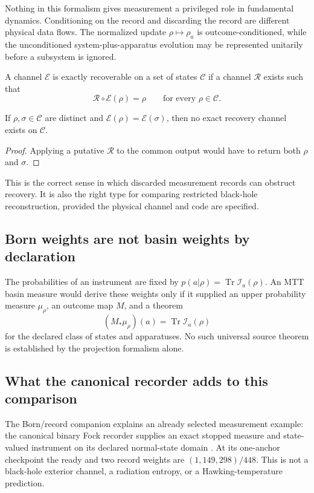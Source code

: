\documentclass[11pt]{article}
\newcommand{\C}{\mathcal C}
\newcommand{\E}{\mathcal E}
\newcommand{\R}{\mathcal R}
\begin{document}
Nothing in this formalism gives measurement a privileged role in fundamental
dynamics. Conditioning on the record and discarding the record are different
physical data flows. The normalized update $\rho\mapsto\rho_a$ is
outcome-conditioned, while the unconditioned system-plus-apparatus evolution
may be represented unitarily before a subsystem is ignored.

\begin{definition}
A channel $\E$ is exactly recoverable on a set of states $\C$ if a channel
$\R$ exists such that
\[
 \R\!\circ\E(\rho)=\rho
 \qquad\text{for every }\rho\in\C.
\]
\end{definition}

\begin{proposition}
If $\rho,\sigma\in\C$ are distinct and
$\E(\rho)=\E(\sigma)$, then no exact recovery channel exists on $\C$.
\end{proposition}

\begin{proof}
Applying a putative $\R$ to the common output would have to return both
$\rho$ and $\sigma$.
\end{proof}

This is the correct sense in which discarded measurement records can obstruct
recovery. It is also the right type for comparing restricted black-hole
reconstruction, provided the physical channel and code are specified.

\subsection{Born weights are not basin weights by declaration}

The probabilities of an instrument are fixed by
$p(a|\rho)=\operatorname{Tr}\mathcal I_a(\rho)$. An MTT basin measure would
derive these weights only if it supplied an upper probability measure
$\mu_\rho$, an outcome map $M$, and a theorem
\[
 (M_*\mu_\rho)(a)
 =\operatorname{Tr}\mathcal I_a(\rho)
\]
for the declared class of states and apparatuses. No such universal source
theorem is established by the projection formalism alone.

\subsection{What the canonical recorder adds to this comparison}
\label{sec:recorder-source-interface}
The Born/record companion explains an already selected measurement example:
the canonical binary Fock recorder supplies an exact stopped measure and
state-valued instrument on its declared normal-state domain
\cite{BornCompanion,FrozenFock}. At its one-anchor checkpoint the ready and
two record weights are \((1,149,298)/448\). This is not a black-hole exterior
channel, a radiation entropy, or a Hawking-temperature prediction.
\end{document}
